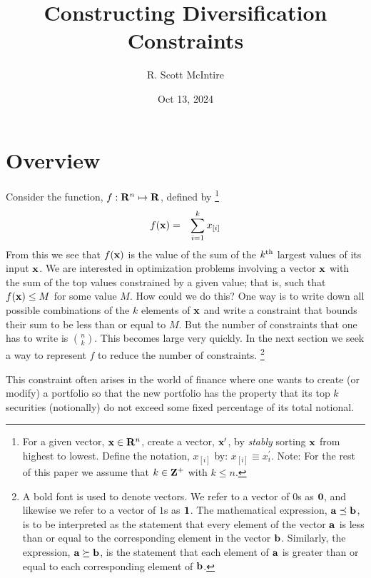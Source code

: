 \documentclass[12pt]{article}
\title{Constructing Diversification Constraints}
\author{R. Scott McIntire}
\date{Oct 13, 2024}
\begin{document}
\maketitle

\section{Overview}
Consider the function, $f: {\bf R}^n \mapsto {\bf R}$, defined by%
\footnote{
For a given vector, ${\bf x} \in {\bf R}^n$, create a vector,  
${\bf x}^\prime$,
by {\it stably\/} sorting ${\bf x}$ from highest to lowest.
Define the notation, $x_{[i]}$ by: $x_{[i]} \equiv x_{i}^\prime$.
Note: For the rest of this paper we assume that $k \in {\bf Z}^+$ with $k \le n$.}
\begin{eqnarray}
	f({\bf x}) & = & \sum_{i=1}^k x_{[i]} 
\end{eqnarray}
From this we see that $f({\bf x})$ is the value of the sum of the $k^{\rm th}$ 
largest values of its input ${\bf x}$.
We are interested in optimization problems involving a vector ${\bf x}$ 
with the sum of the top values constrained by a given value; that is, 
such that $f({\bf x}) \le M$  for some value $M$.
How could we do this? One way is to write down all possible combinations of the 
$k$ elements of ${\bf x}$ and write a constraint that bounds their sum to be 
less than or equal to $M$.  But the number of constraints that one has to 
write is $n \choose k$. This becomes large very quickly. 
In the next section we seek a way to represent $f$ to 
reduce the number of constraints.%
\footnote{A bold font is used to denote vectors. We refer to a  
vector of $0$s as ${\bf 0}$, and likewise we refer to a vector of $1$s
as ${\bf 1}$. The mathematical expression, ${\bf a} \preceq {\bf b}$, is to be 
interpreted as the statement that every element of the vector ${\bf a}$ is 
less than or equal to the corresponding element in the vector ${\bf b}$. 
Similarly, the expression, ${\bf a} \succeq {\bf b}$, is the statement that 
each element of ${\bf a}$ is greater than or equal to each 
corresponding element of ${\bf b}$.
}

This constraint often arises in the world of finance where one wants to 
create (or modify) a portfolio so that the new portfolio has the property
that its top $k$ securities (notionally) do not exceed some fixed percentage 
of its total notional.
\end{document}
